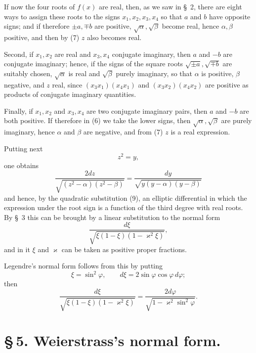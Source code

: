 \documentclass[11pt]{article}
\begin{document}
If now the four roots of $f(x)$ are real, then, as we saw in \S~2, there are eight ways to assign these roots to the signs $x_1,x_2,x_3,x_4$ so that $a$ and $b$ have opposite signs; and if therefore $\pm a,\mp b$ are positive, $\sqrt{\alpha},\sqrt{\beta}$ become real, hence $\alpha,\beta$ positive, and then by (7) $z$ also becomes real.

Second, if $x_1,x_2$ are real and $x_3,x_4$ conjugate imaginary, then $a$ and $-b$ are conjugate imaginary; hence, if the signs of the square roots $\sqrt{\pm a},\sqrt{\mp b}$ are suitably chosen, $\sqrt{\alpha}$ is real and $\sqrt{\beta}$ purely imaginary, so that $\alpha$ is positive, $\beta$ negative, and $z$ real, since $(x_3x_1)(x_4x_1)$ and $(x_3x_2)(x_4x_2)$ are positive as products of conjugate imaginary quantities.

Finally, if $x_1,x_2$ and $x_3,x_4$ are two conjugate imaginary pairs, then $a$ and $-b$ are both positive. If therefore in (6) we take the lower signs, then $\sqrt{\alpha},\sqrt{\beta}$ are purely imaginary, hence $\alpha$ and $\beta$ are negative, and from (7) $z$ is a real expression.

Putting next
\begin{equation}
z^2=y,
\tag{9}
\end{equation}
one obtains
\begin{equation}
\frac{2dz}{\sqrt{(z^2-\alpha)(z^2-\beta)}}=
\frac{dy}{\sqrt{y(y-\alpha)(y-\beta)}}
\tag{10}
\end{equation}
and hence, by the quadratic substitution (9), an elliptic differential in which the expression under the root sign is a function of the third degree with real roots. By \S~3 this can be brought by a linear substitution to the normal form
\[
\frac{d\xi}{\sqrt{\xi(1-\xi)(1-\varkappa^2\xi)}},
\]
and in it $\xi$ and $\varkappa$ can be taken as positive proper fractions.

Legendre's normal form follows from this by putting
\[
\xi=\sin^2\varphi,\qquad d\xi=2\sin\varphi\cos\varphi\,d\varphi;
\]
then
\begin{equation}
\frac{d\xi}{\sqrt{\xi(1-\xi)(1-\varkappa^2\xi)}}=
\frac{2d\varphi}{\sqrt{1-\varkappa^2\sin^2\varphi}}.
\tag{11}
\end{equation}

\section*{\S\,5. Weierstrass's normal form.}
\end{document}
